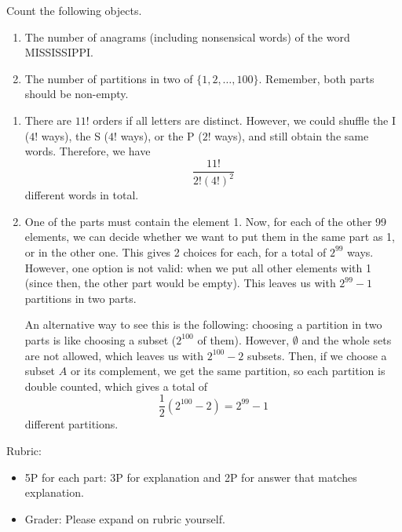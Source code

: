 \documentclass{article}
\theoremstyle{definition}
\begin{document}
\begin{question}
    Count the following objects.
    	\begin{enumerate}
    	\item The number of anagrams (including nonsensical words) of the word MISSISSIPPI.
   	 \item The number of partitions in two of $\{1, 2, \dots, 100 \}$. Remember, both parts should be non-empty.
   	\end{enumerate}
\end{question}
\begin{solution}
    	\begin{enumerate}
    	\item There are $11!$ orders if all letters are distinct. However, we could shuffle the I ($4!$ ways), the S ($4!$ ways), or the P ($2!$ ways), and still obtain the same words. Therefore, we have
	\[
	\frac{11!}{2! (4!)^2}
	\]
	different words in total.
   	 \item One of the parts must contain the element 1. Now, for each of the other 99 elements, we can decide whether we want to put them in the same part as 1, or in the other one. This gives 2 choices for each, for a total of $2^{99}$ ways. However, one option is not valid: when we put all other elements with 1 (since then, the other part would be empty). This leaves us with $2^{99} - 1$ partitions in two parts.
	
	An alternative way to see this is the following: choosing a partition in two parts is like choosing a subset ($2^{100}$ of them). However, $\emptyset$ and the whole sets are not allowed, which leaves us with $2^{100} - 2$ subsets. Then, if we choose a subset $A$ or its complement, we get the same partition, so each partition is double counted, which gives a total of
	\[
	\frac12 \left ( 2^{100} - 2 \right ) = 2^{99} - 1
	\]
	different partitions.
   	\end{enumerate}
 {\color{red} Rubric:
\begin{itemize}
\item 5P for each part: 3P for explanation and 2P for answer that matches explanation.
\item Grader: Please expand on rubric yourself.
\end{itemize}}
\end{solution}
\end{document}
